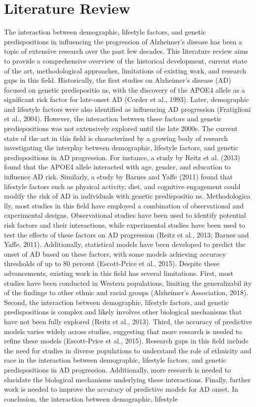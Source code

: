\documentclass[conference]{IEEEtran}
\begin{document}
\section{Literature Review}
The interaction between demographic, lifestyle factors, and genetic predispositions in influencing the progression of Alzheimer's disease has been a topic of extensive research over the past few decades. This literature review aims to provide a comprehensive overview of the historical development, current state of the art, methodological approaches, limitations of existing work, and research gaps in this field. Historically, the first studies on Alzheimer's disease (AD) focused on genetic predispositio ns, with the discovery of the APOE4 allele as a significant risk factor for late-onset AD (Corder et al., 1993). Later, demographic and lifestyle factors were also identified as influencing AD progression (Fratiglioni et al., 2004). However, the interaction between these factors and genetic predispositions was not extensively explored until the late 2000s. The current state of the art in this field is characterized by a growing body of research investigating the interplay between demographic, lifestyle factors, and genetic predispositions in AD progression. For instance, a study by Reitz et al. (2013) found that the APOE4 allele interacted with age, gender, and education to influence AD risk. Similarly, a study by Barnes and Yaffe (2011) found that lifestyle factors such as physical activity, diet, and cognitive engagement could modify the risk of AD in individuals with genetic predispositio ns. Methodologica lly, most studies in this field have employed a combination of observational and experimental designs. Observational studies have been used to identify potential risk factors and their interactions, while experimental studies have been used to test the effects of these factors on AD progression (Reitz et al., 2013; Barnes and Yaffe, 2011). Additionally, statistical models have been developed to predict the onset of AD based on these factors, with some models achieving accuracy thresholds of up to 80 percent (Escott-Price et al., 2015). Despite these advancements, existing work in this field has several limitations. First, most studies have been conducted in Western populations, limiting the generalizabil ity of the findings to other ethnic and racial groups (Alzheimer's Association, 2018). Second, the interaction between demographic, lifestyle factors, and genetic predispositions is complex and likely involves other biological mechanisms that have not been fully explored (Reitz et al., 2013). Third, the accuracy of predictive models varies widely across studies, suggesting that more research is needed to refine these models (Escott-Price et al., 2015). Research gaps in this field include the need for studies in diverse populations to understand the role of ethnicity and race in the interaction between demographic, lifestyle factors, and genetic predispositions in AD progression. Additionally, more research is needed to elucidate the biological mechanisms underlying these interactions. Finally, further work is needed to improve the accuracy of predictive models for AD onset. In conclusion, the interaction between demographic, lifestyle 
\end{document}
